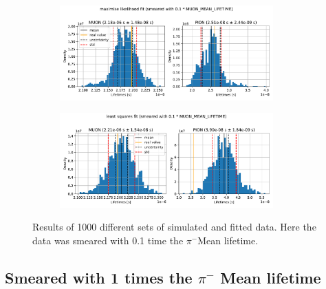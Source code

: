 \documentclass[11pt, a4paper, oneside]{book}
\newcommand\DoublePlotwidth{0.9}
\newcommand{\pion}{$\pi^{-}$}
\begin{document}
\begin{figure}[h]
\begin{subfigure}{\textwidth}
  \centering
  \includegraphics[width=\DoublePlotwidth\textwidth]{images/4b_hist_1_likelihood.pdf}
\end{subfigure}

\begin{subfigure}{\textwidth}
  \centering
  \includegraphics[width=\DoublePlotwidth\textwidth]{images/4b_hist_1_squares.pdf}
\end{subfigure}
\caption{Results of 1000 different sets of simulated and fitted data. Here the data was smeared with 0.1 time the \pion Mean lifetime.}
\label{fig:results_smeared_1}
\end{figure}

\FloatBarrier
\subsection{Smeared with 1 times the \texorpdfstring{\pion}{pion} Mean lifetime}
\end{document}
